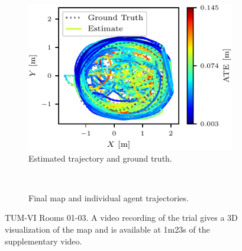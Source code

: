 \begin{figure}[h]
    \centering
    \captionsetup{format=plain}
    \begin{subfigure}[t]{0.5\linewidth}
        \centering
        \includegraphics[width=0.9\linewidth]{figures/apr11_tum_room_trajectory_a_trajectory.pdf}
        \caption{Estimated trajectory and ground truth.}
    \end{subfigure}\hfill%
    ~
    \begin{subfigure}[t]{0.45\linewidth}
        \centering
        \caption{Final map and individual agent trajectories.}
    \end{subfigure}

    \caption{TUM-VI Rooms 01-03. A video recording of the trial gives a 3D visualization of the map and is available at 1m23s  of the supplementary video\protect\footnotemark[1].}
    \label{fig:tum-traj}
\end{figure}

